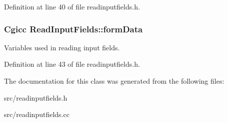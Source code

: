 Definition at line 40 of file readinputfields.\-h.

\hypertarget{classReadInputFields_a1afc98860170fbb50a08d1f3eec7ddc2}{
\subsubsection[{form\-Data}]{\setlength{\rightskip}{0pt plus 5cm}Cgicc Read\-Input\-Fields\-::form\-Data\hspace{0.3cm}{\ttfamily [protected]}}}\label{classReadInputFields_a1afc98860170fbb50a08d1f3eec7ddc2}


Variables used in reading input fields. 



Definition at line 43 of file readinputfields.\-h.



The documentation for this class was generated from the following files\-:\begin{DoxyCompactItemize}
\item 
src/readinputfields.\-h\item 
src/readinputfields.\-cc\end{DoxyCompactItemize}
